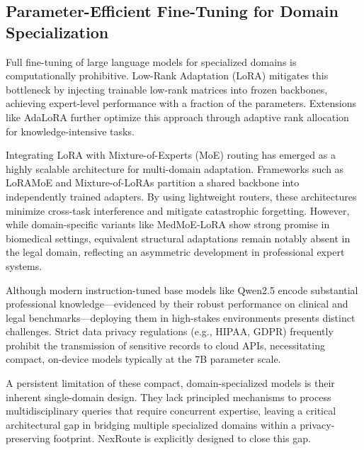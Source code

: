 \documentclass[a4paper,fleql]{cas-sc}
\begin{document}
\subsection{Parameter-Efficient Fine-Tuning for Domain Specialization}
Full fine-tuning of large language models for specialized domains is
computationally prohibitive. Low-Rank Adaptation (LoRA) \citep{hu2022lora}
mitigates this bottleneck by injecting trainable low-rank matrices into frozen
backbones, achieving expert-level performance with a fraction of the parameters.
Extensions like AdaLoRA \citep{zhang2023adalora} further optimize this approach
through adaptive rank allocation for knowledge-intensive tasks.

Integrating LoRA with Mixture-of-Experts (MoE) routing has emerged as a
highly scalable architecture for multi-domain adaptation. Frameworks such as
LoRAMoE \citep{dou2024loramoe} and Mixture-of-LoRAs \citep{wu2024mixtureofloras}
partition a shared backbone into independently trained adapters. By using
lightweight routers, these architectures minimize cross-task interference and
mitigate catastrophic forgetting. However, while domain-specific variants
like MedMoE-LoRA \citep{yang2025medmoelora} show strong promise in biomedical
settings, equivalent structural adaptations remain notably absent in the legal
domain, reflecting an asymmetric development in professional expert systems.

Although modern instruction-tuned base models like Qwen2.5 \citep{qwen2025qwen25}
encode substantial professional knowledge—evidenced by their robust performance
on clinical \citep{singhal2023large} and legal \citep{guha2023legalbench}
benchmarks—deploying them in high-stakes environments presents distinct
challenges. Strict data privacy regulations (e.g., HIPAA, GDPR) frequently
prohibit the transmission of sensitive records to cloud APIs, necessitating
compact, on-device models typically at the 7B parameter scale. 

A persistent limitation of these compact, domain-specialized models is their
inherent single-domain design. They lack principled mechanisms to process
multidisciplinary queries that require concurrent expertise, leaving a critical
architectural gap in bridging multiple specialized domains within a
privacy-preserving footprint. NexRoute is explicitly designed to close this gap.

\end{document}
